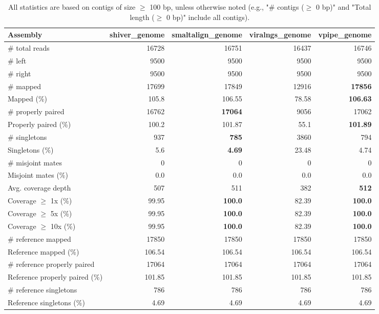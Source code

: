 \documentclass[12pt,a4paper]{article}
\begin{document}
\begin{table}[ht]
\begin{center}
\caption{All statistics are based on contigs of size $\geq$ 100 bp, unless otherwise noted (e.g., "\# contigs ($\geq$ 0 bp)" and "Total length ($\geq$ 0 bp)" include all contigs).}
\begin{tabular}{|l*{4}{|r}|}
\hline
Assembly & shiver\_genome & smaltalign\_genome & viralngs\_genome & vpipe\_genome \\ \hline
\# total reads & 16728 & 16751 & 16437 & 16746 \\ \hline
\# left & 9500 & 9500 & 9500 & 9500 \\ \hline
\# right & 9500 & 9500 & 9500 & 9500 \\ \hline
\# mapped & 17699 & 17849 & 12916 & {\bf 17856} \\ \hline
Mapped (\%) & 105.8 & 106.55 & 78.58 & {\bf 106.63} \\ \hline
\# properly paired & 16762 & {\bf 17064} & 9056 & 17062 \\ \hline
Properly paired (\%) & 100.2 & 101.87 & 55.1 & {\bf 101.89} \\ \hline
\# singletons & 937 & {\bf 785} & 3860 & 794 \\ \hline
Singletons (\%) & 5.6 & {\bf 4.69} & 23.48 & 4.74 \\ \hline
\# misjoint mates & 0 & 0 & 0 & 0 \\ \hline
Misjoint mates (\%) & 0.0 & 0.0 & 0.0 & 0.0 \\ \hline
Avg. coverage depth & 507 & 511 & 382 & {\bf 512} \\ \hline
Coverage $\geq$ 1x (\%) & 99.95 & {\bf 100.0} & 82.39 & {\bf 100.0} \\ \hline
Coverage $\geq$ 5x (\%) & 99.95 & {\bf 100.0} & 82.39 & {\bf 100.0} \\ \hline
Coverage $\geq$ 10x (\%) & 99.95 & {\bf 100.0} & 82.39 & {\bf 100.0} \\ \hline
\# reference mapped & 17850 & 17850 & 17850 & 17850 \\ \hline
Reference mapped (\%) & 106.54 & 106.54 & 106.54 & 106.54 \\ \hline
\# reference properly paired & 17064 & 17064 & 17064 & 17064 \\ \hline
Reference properly paired (\%) & 101.85 & 101.85 & 101.85 & 101.85 \\ \hline
\# reference singletons & 786 & 786 & 786 & 786 \\ \hline
Reference singletons (\%) & 4.69 & 4.69 & 4.69 & 4.69 \\ \hline

\end{tabular}
\end{center}
\end{table}
\end{document}
